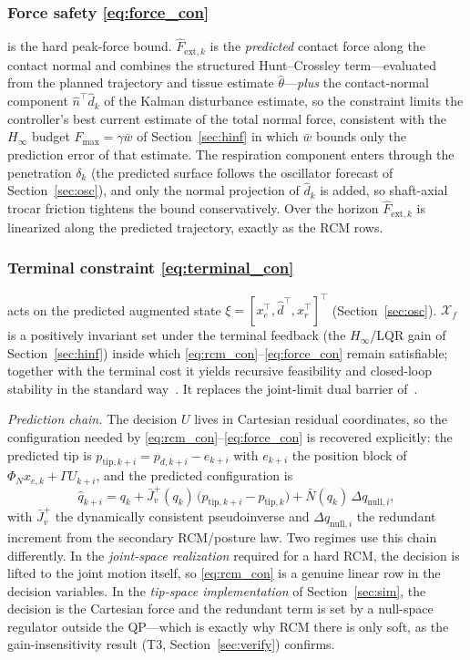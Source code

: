 \subsubsection{Force safety \eqref{eq:force_con}} is the hard peak-force bound. $\widehat{F}_{\text{ext},k}$ is the \emph{predicted} contact force along the contact normal and combines the structured Hunt--Crossley term---evaluated from the planned trajectory and tissue estimate $\hat\theta$---\emph{plus} the contact-normal component $\hat n^\top\hat d_k$ of the Kalman disturbance estimate, so the constraint limits the controller's best current estimate of the total normal force, consistent with the $H_\infty$ budget $F_{\max}=\gamma\bar w$ of Section~\ref{sec:hinf} in which $\bar w$ bounds only the prediction error of that estimate. The respiration component enters through the penetration $\delta_k$ (the predicted surface follows the oscillator forecast of Section~\ref{sec:osc}), and only the normal projection of $\hat d_k$ is added, so shaft-axial trocar friction tightens the bound conservatively. Over the horizon $\widehat{F}_{\text{ext},k}$ is linearized along the predicted trajectory, exactly as the RCM rows.

\subsubsection{Terminal constraint \eqref{eq:terminal_con}} acts on the predicted augmented state $\xi=[x_e^\top,\hat d^\top,x_r^\top]^\top$ (Section~\ref{sec:osc}). $\mathcal{X}_f$ is a positively invariant set under the terminal feedback (the $H_\infty$/LQR gain of Section~\ref{sec:hinf}) inside which \eqref{eq:rcm_con}--\eqref{eq:force_con} remain satisfiable; together with the terminal cost it yields recursive feasibility and closed-loop stability in the standard way~\cite{mayne2000}. It replaces the joint-limit dual barrier of~\cite{cao2026phri}.

\emph{Prediction chain.} The decision $U$ lives in Cartesian residual coordinates, so the configuration needed by \eqref{eq:rcm_con}--\eqref{eq:force_con} is recovered explicitly: the predicted tip is $p_{\text{tip},k+i}=p_{d,k+i}-e_{k+i}$ with $e_{k+i}$ the position block of $\Phi_N x_{e,k}+\Gamma U_{k+i}$, and the predicted configuration is
\begin{equation*}
\hat q_{k+i}=q_k+\bar J_v^{+}(q_k)\,\big(p_{\text{tip},k+i}-p_{\text{tip},k}\big)+\bar N(q_k)\,\Delta q_{\text{null},i},
\end{equation*}
with $\bar J_v^{+}$ the dynamically consistent pseudoinverse and $\Delta q_{\text{null},i}$ the redundant increment from the secondary RCM/posture law. Two regimes use this chain differently. In the \emph{joint-space realization} required for a hard RCM, the decision is lifted to the joint motion itself, so \eqref{eq:rcm_con} is a genuine linear row in the decision variables. In the \emph{tip-space implementation} of Section~\ref{sec:sim}, the decision is the Cartesian force and the redundant term is set by a null-space regulator outside the QP---which is exactly why RCM there is only soft, as the gain-insensitivity result (T3, Section~\ref{sec:verify}) confirms.

